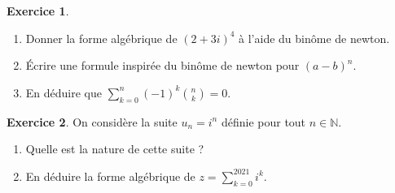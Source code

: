 \documentclass{exam}
\theoremstyle{definition}
\newtheorem{exercice}{Exercice}
\begin{document}
\vspace{1em}

\begin{exercice}\ 
    \begin{enumerate}
        \item Donner la forme algébrique de $(2+3i)^4$ à l'aide du binôme de newton.
        \item Écrire une formule inspirée du binôme de newton pour $(a-b)^n$.
        \item En déduire que $\sum_{k=0}^{n} (-1)^k \binom{n}{k} = 0$.
    \end{enumerate}
\end{exercice}

\vspace{1em}

\begin{exercice}
    On considère la suite $u_n = i^n$ définie pour tout $n \in \mathbb{N}$.
    \begin{enumerate}
        \item Quelle est la nature de cette suite ?
        \item En déduire la forme algébrique de $z = \sum_{k=0}^{2021} i^k$.
    \end{enumerate}
\end{exercice}
\end{document}
